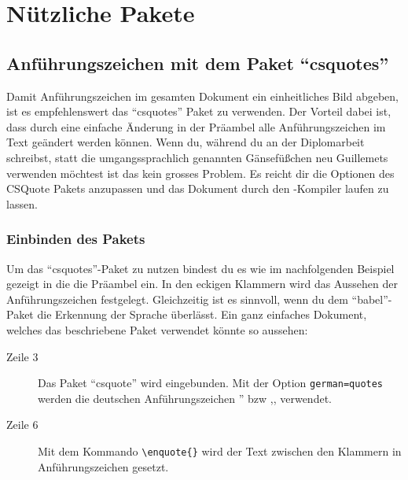 %
%

\chapter{Nützliche Pakete}

\section{Anführungszeichen mit dem Paket \enquote{csquotes}}
\label{sec:anfuehrungszeichen}

Damit Anführungszeichen im gesamten Dokument ein einheitliches Bild abgeben, ist es empfehlenswert das \enquote{csquotes} Paket zu verwenden. Der Vorteil dabei ist, dass durch eine einfache Änderung in der Präambel alle Anführungszeichen im Text geändert werden können. Wenn du, während du an der Diplomarbeit schreibst, statt die umgangssprachlich genannten Gänsefüßchen neu Guillemets verwenden möchtest ist das kein grosses Problem. Es reicht dir die Optionen des CSQuote Pakets anzupassen und das Dokument durch den \DMLLaTeX-Kompiler laufen zu lassen.

\subsection{Einbinden des Pakets}

Um das \enquote{csquotes}-Paket zu nutzen bindest du es wie im nachfolgenden Beispiel gezeigt in die die Präambel ein. In den eckigen Klammern wird das Aussehen der Anführungszeichen festgelegt. Gleichzeitig ist es sinnvoll, wenn du dem \enquote{babel}-Paket die Erkennung der Sprache überlässt. Ein ganz einfaches Dokument, welches das beschriebene Paket verwendet könnte so aussehen:



\begin{description}
\item[Zeile 3] Das Paket \enquote{csquote} wird eingebunden. Mit der Option \texttt{german=quotes} werden die deutschen Anführungszeichen '' bzw ,, verwendet.
\item[Zeile 6] Mit dem Kommando \texttt{\textbackslash enquote\{\}} wird der Text zwischen den Klammern in Anführungszeichen gesetzt.
\end{description}

